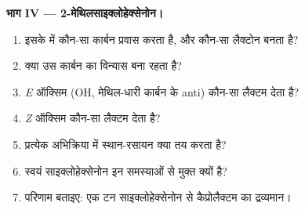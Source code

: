 \begin{problem}
\medskip\noindent\textbf{भाग IV --- 2-मेथिलसाइक्लोहेक्सेनोन।}
\begin{enumerate}[resume]
  \item इसके  में कौन-सा कार्बन प्रवास करता है, और कौन-सा लैक्टोन बनता है?
  \item क्या उस कार्बन का विन्यास बना रहता है?
  \item \textit{E} ऑक्सिम (OH, मेथिल-धारी कार्बन के anti) कौन-सा लैक्टम देता है?
  \item \textit{Z} ऑक्सिम कौन-सा लैक्टम देता है?
  \item प्रत्येक अभिक्रिया में स्थान-रसायन क्या तय करता है?
  \item स्वयं साइक्लोहेक्सेनोन इन समस्याओं से मुक्त क्यों है?
  \item परिणाम बताइए: एक टन साइक्लोहेक्सेनोन से कैप्रोलैक्टम का द्रव्यमान।
\end{enumerate}
\end{problem}

